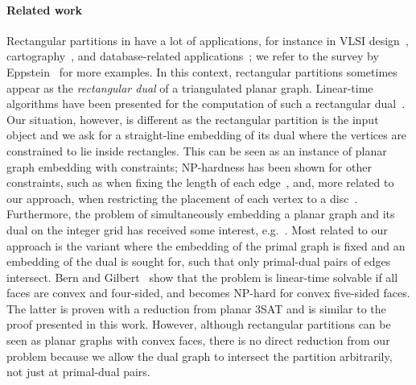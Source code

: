 \documentclass[12pt]{article}
\begin{document}
\paragraph{Related work}
Rectangular partitions in  have a lot of applications, for instance
 in VLSI design~\cite{lly-compact}, cartography~\cite{reisz-statistical}, and database-related applications~\cite{mps-rectangular}; 
we refer to the survey by Eppstein~\cite{eppstein-regular}
for more examples. In this context, rectangular partitions sometimes appear as the \emph{rectangular dual} of a triangulated planar graph. 
Linear-time algorithms have been presented for the computation 
of such a rectangular dual~\cite{he-finding}.
Our situation, however, is different as the rectangular partition is the input object and we ask for a straight-line embedding of its dual
where the vertices are constrained to lie inside rectangles. 
This can be seen as an instance of planar graph embedding with constraints;
NP-hardness has been shown for other constraints, such as when fixing the length of each edge~\cite{ew-fixed}, and, more related to our approach, when restricting
the placement of each vertex to a disc~\cite{godau-difficulty}. Furthermore, the problem of simultaneously embedding a planar graph and its dual on the integer grid
has received some interest, e.g.~\cite{ek-simultaneous}. Most related to our approach is the variant where the embedding of the primal graph is fixed and an embedding
of the dual is sought for, such that only primal-dual pairs of edges intersect. Bern and Gilbert~\cite{bg-drawing} show that the problem is linear-time solvable
if all faces are convex and four-sided, and becomes NP-hard for convex five-sided faces. The latter is proven with a reduction from planar 3SAT and is
similar to the proof presented in this work. However, although rectangular partitions can be seen as planar graphs with convex faces, there is no direct
reduction from our problem because we allow the dual graph to intersect the partition arbitrarily, not just at primal-dual pairs.
\end{document}
